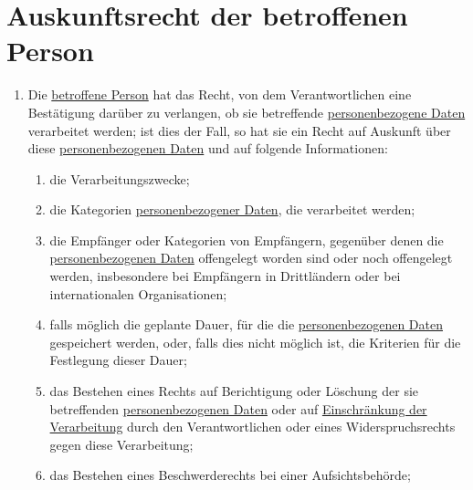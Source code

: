 \chapter{Auskunftsrecht der betroffenen Person}
\label{ch:15}


\begin{enumerate}

  \item Die \hyperref[itm:04-1]{betroffene Person} hat das Recht, von dem Verantwortlichen eine Bestätigung darüber zu verlangen, ob sie
   betreffende \hyperref[itm:04-1]{personenbezogene Daten} verarbeitet werden; ist dies der Fall, so hat sie ein Recht auf Auskunft über
   diese \hyperref[itm:04-1]{personenbezogenen Daten} und auf folgende Informationen:
  \label{itm:15-1}

  \begin{enumerate}
  
    \item die Verarbeitungszwecke;
    \label{itm:15-1a}

    \item die Kategorien \hyperref[itm:04-1]{personenbezogener Daten}, die verarbeitet werden;
    \label{itm:15-1b}

    \item die Empfänger oder Kategorien von Empfängern, gegenüber denen die \hyperref[itm:04-1]{personenbezogenen Daten} offengelegt worden
     sind oder noch offengelegt werden, insbesondere bei Empfängern in Drittländern oder bei internationalen
     Organisationen;
    \label{itm:15-1c}

    \item falls möglich die geplante Dauer, für die die \hyperref[itm:04-1]{personenbezogenen Daten} gespeichert werden, oder, falls dies
     nicht möglich ist, die Kriterien für die Festlegung dieser Dauer;
    \label{itm:15-1d}

    \item das Bestehen eines Rechts auf Berichtigung oder Löschung der sie betreffenden \hyperref[itm:04-1]{personenbezogenen Daten} oder auf
     \hyperref[itm:04-3]{Einschränkung der Verarbeitung} durch den Verantwortlichen oder eines Widerspruchsrechts gegen diese Verarbeitung;
    \label{itm:15-1e}

    \item das Bestehen eines Beschwerderechts bei einer Aufsichtsbehörde;
    \label{itm:15-1f}


\end{enumerate}
\end{enumerate}
